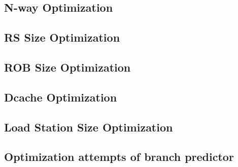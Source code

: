 \subsection{N-way Optimization}



\subsection{RS Size Optimization}

\subsection{ROB Size Optimization}





\subsection{Dcache Optimization}


\subsection{Load Station Size Optimization}


\subsection{Optimization attempts of branch predictor}


